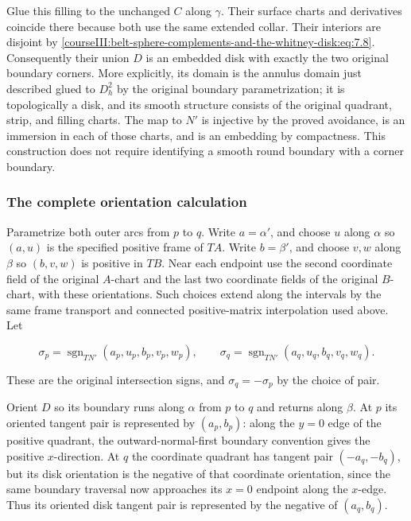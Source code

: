 Glue this filling to the unchanged \(C\) along \(\gamma\). Their surface charts and derivatives coincide there because both use the same extended collar. Their interiors are disjoint by \eqref{courseIII:belt-sphere-complements-and-the-whitney-disk:eq:7.8}. Consequently their union \(D\) is an embedded disk with exactly the two original boundary corners. More explicitly, its domain is the annulus domain just described glued to \(D_h^2\) by the original boundary parametrization; it is topologically a disk, and its smooth structure consists of the original quadrant, strip, and filling charts. The map to \(N'\) is injective by the proved avoidance, is an immersion in each of those charts, and is an embedding by compactness. This construction does not require identifying a smooth round boundary with a corner boundary.

\subsubsection{The complete orientation calculation}
\label{courseIII:belt-sphere-complements-and-the-whitney-disk:whitney-orientations}

\label{courseIII:belt-sphere-complements-and-the-whitney-disk:section-7.4}

Parametrize both outer arcs from \(p\) to \(q\). Write \(a=\alpha'\), and choose \(u\) along \(\alpha\) so \((a,u)\) is the specified positive frame of \(TA\). Write \(b=\beta'\), and choose \(v,w\) along \(\beta\) so \((b,v,w)\) is positive in \(TB\). Near each endpoint use the second coordinate field of the original \(A\)-chart and the last two coordinate fields of the original \(B\)-chart, with these orientations. Such choices extend along the intervals by the same frame transport and connected positive-matrix interpolation used above. Let

\begin{equation}
\sigma_p=\operatorname{sgn}_{TN'}(a_p,u_p,b_p,v_p,w_p),
\qquad
\sigma_q=\operatorname{sgn}_{TN'}(a_q,u_q,b_q,v_q,w_q).
\label{courseIII:belt-sphere-complements-and-the-whitney-disk:eq:7.9}
\end{equation}

These are the original intersection signs, and \(\sigma_q=-\sigma_p\) by the choice of pair.

Orient \(D\) so its boundary runs along \(\alpha\) from \(p\) to \(q\) and returns along \(\beta\). At \(p\) its oriented tangent pair is represented by \((a_p,b_p)\): along the \(y=0\) edge of the positive quadrant, the outward-normal-first boundary convention gives the positive \(x\)-direction. At \(q\) the coordinate quadrant has tangent pair \((-a_q,-b_q)\), but its disk orientation is the negative of that coordinate orientation, since the same boundary traversal now approaches its \(x=0\) endpoint along the \(x\)-edge. Thus its oriented disk tangent pair is represented by the negative of \((a_q,b_q)\).

